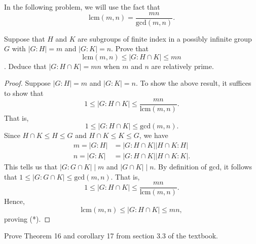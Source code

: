 \documentclass[a4paper]{article}
\begin{document}
In the following problem, we will use the fact that
\[  \text{lcm}(m,n) = \frac{ mn  }{  \text{gcd}(m,n) }.  \]
\begin{problem}
    Suppose that \( H  \) and \( K  \) are subgroups of finite index in a possibly infinite group \( G  \) with \( | G : H  |  = m  \) and \( | G : K  |  = n  \). Prove that \[ \text{lcm}(m,n) \leq | G : H \cap K  |  \leq m n  \]. Deduce that \( | G : H \cap K  |  = mn  \) when \( m  \) and \( n  \) are relatively prime.
\end{problem}
\begin{proof}
Suppose \( | G : H  |  = m  \) and \( | G : K |  = n  \). To show the above result, it suffices to show that 
\[  1 \leq | G : H \cap K  |  \leq \frac{ m n  }{ \text{lcm}(m,n) }. \tag{*} \]
That is, 
\[  1 \leq | G : H \cap K  | \leq \text{gcd}(m,n).  \]
Since \( H \cap K \leq H \leq G     \) and \( H \cap K \leq K \leq G  \), we have 
\begin{align*}
    m = | G : H  | &= | G : H \cap K  | |H \cap K : H  |  \\
    n = | G : K  | &= | G : H \cap K  | |H \cap K : K  |. 
\end{align*}
This tells us that \( | G : G \cap K  | \mid m    \) and \( | G \cap K  | \mid n    \). By definition of \( \text{gcd} \), it follows that \( 1 \leq | G : G \cap K  | \leq \text{gcd}(m,n)   \). That is,
\[  1 \leq | G : H \cap K  | \leq \frac{ m n  }{ \text{lcm}(m,n) }.  \]
Hence, 
\[  \text{lcm}(m,n) \leq | G : H \cap K |  \leq m n,  \]
proving (*).
\end{proof}

\begin{problem}
    Prove Theorem 16 and corollary 17 from section 3.3 of the textbook.
\end{problem}
\end{document}

